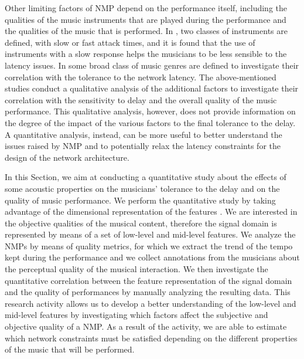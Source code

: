Other limiting factors of NMP depend on the performance itself, including the qualities of the music instruments that are played during the performance and the qualities of the music that is performed. In \cite{barbosa2011influence}, two classes of instruments are defined, with slow or fast attack times, and it is found that the use of instruments with a slow response helps the musicians to be less sensible to the latency issues. In \cite{Chew2004} some broad class of music genres are defined to investigate their correlation with the tolerance to the network latency. The above-mentioned studies conduct a qualitative analysis of the additional factors to investigate their correlation with the sensitivity to delay and the overall quality of the music performance. This qualitative analysis, however, does not provide information on the degree of the impact of the various factors to the final tolerance to the delay. A quantitative analysis, instead, can be more useful to better understand the issues raised by NMP and to potentially relax the latency constraints for the design of the network architecture. 

In this Section, we aim at conducting a quantitative study about the effects of some acoustic properties on the musicians' tolerance to the delay and on the quality of music performance. We perform the quantitative study by taking advantage of the dimensional representation of the features \cite{Kim2005,Zanoni2012}. We are interested in the objective qualities of the musical content, therefore the signal domain is represented by means of a set of low-level and mid-level features. We analyze the NMPs by means of quality metrics, for which we extract the trend of the tempo kept during the performance and we collect annotations from the musicians about the perceptual quality of the musical interaction. We then investigate the quantitative correlation between the feature representation of the signal domain and the quality of performances by manually analyzing the resulting data. This research activity allows us to develop a better understanding of the low-level and mid-level features by investigating which factors affect the subjective and objective quality of a NMP. As a result of the activity, we are able to estimate which network constraints must be satisfied depending on the different properties of the music that will be performed.

